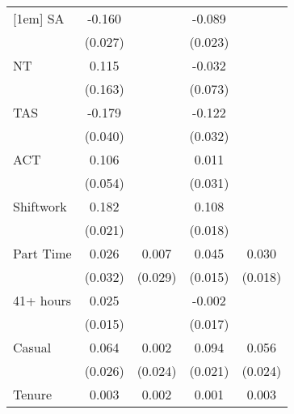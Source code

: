{\begin{tabular}{l*{4}{c}}
[1em]
SA                  &      -0.160\sym{***}&                     &      -0.089\sym{***}&                     \\
                    &     (0.027)         &                     &     (0.023)         &                     \\
[1em]
NT                  &       0.115         &                     &      -0.032         &                     \\
                    &     (0.163)         &                     &     (0.073)         &                     \\
[1em]
TAS                 &      -0.179\sym{***}&                     &      -0.122\sym{***}&                     \\
                    &     (0.040)         &                     &     (0.032)         &                     \\
[1em]
ACT                 &       0.106         &                     &       0.011         &                     \\
                    &     (0.054)         &                     &     (0.031)         &                     \\
[1em]
Shiftwork           &       0.182\sym{***}&                     &       0.108\sym{***}&                     \\
                    &     (0.021)         &                     &     (0.018)         &                     \\
[1em]
Part Time           &       0.026         &       0.007         &       0.045\sym{**} &       0.030         \\
                    &     (0.032)         &     (0.029)         &     (0.015)         &     (0.018)         \\
[1em]
41+ hours           &       0.025         &                     &      -0.002         &                     \\
                    &     (0.015)         &                     &     (0.017)         &                     \\
[1em]
Casual              &       0.064\sym{*}  &       0.002         &       0.094\sym{***}&       0.056\sym{*}  \\
                    &     (0.026)         &     (0.024)         &     (0.021)         &     (0.024)         \\
[1em]
Tenure              &       0.003\sym{*}  &       0.002\sym{*}  &       0.001         &       0.003\sym{**} \\

\end{tabular}}
